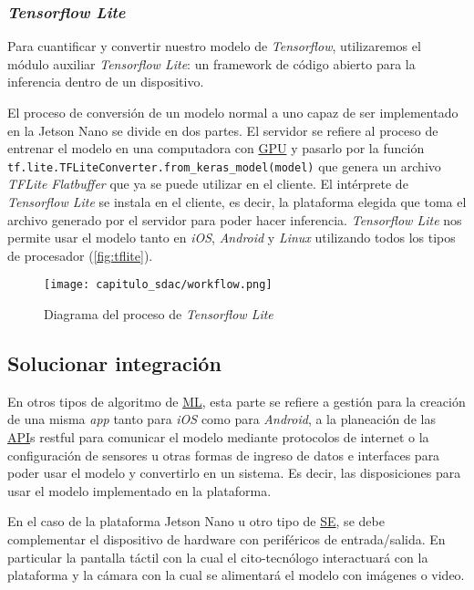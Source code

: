 \subsubsection{\emph{Tensorflow Lite}}

Para cuantificar y convertir nuestro modelo de \emph{Tensorflow}, utilizaremos
el módulo auxiliar \emph{Tensorflow Lite}: un framework de código abierto para
la inferencia dentro de un dispositivo.

El proceso de conversión de un modelo normal a uno capaz de ser implementado en
la Jetson Nano se divide en dos partes. El servidor se refiere al proceso de
entrenar el modelo en una computadora con \hyperlink{abbr}{GPU} y pasarlo por la
función \texttt{tf.lite.TFLiteConverter.from_keras_model(model)} que
genera un archivo \emph{TFLite Flatbuffer} que ya se puede utilizar en el
cliente. El intérprete de \emph{Tensorflow Lite} se instala en el cliente, es
decir, la plataforma elegida que toma el archivo generado por el servidor para
poder hacer inferencia. \emph{Tensorflow Lite} nos permite usar el modelo tanto
en \emph{iOS}, \emph{Android} y \emph{Linux} utilizando todos los tipos de
procesador (\autoref{fig:tflite}).

\begin{figure}[H]
    \centering
    \texttt{[image: capitulo\_sdac/workflow.png]}
    \caption{Diagrama del proceso de \emph{Tensorflow Lite}}\label{fig:tflite}
\end{figure}

\subsection{Solucionar integración}

En otros tipos de algoritmo de \hyperlink{abbr}{ML}, esta parte se refiere a
gestión para la creación de una misma \emph{app} tanto para \emph{iOS} como para
\emph{Android}, a la planeación de las \hyperlink{abbr}{API}s restful para
comunicar el modelo mediante protocolos de internet o la configuración de
sensores u otras formas de ingreso de datos e interfaces para poder usar el
modelo y convertirlo en un sistema. Es decir, las disposiciones para usar el
modelo implementado en la plataforma.

En el caso de la plataforma Jetson Nano u otro tipo de \hyperlink{abbr}{SE}, se
debe complementar el dispositivo de hardware con periféricos de entrada/salida.
En particular la pantalla táctil con la cual el cito-tecnólogo interactuará con
la plataforma y la cámara con la cual se alimentará el modelo con imágenes o
video.

